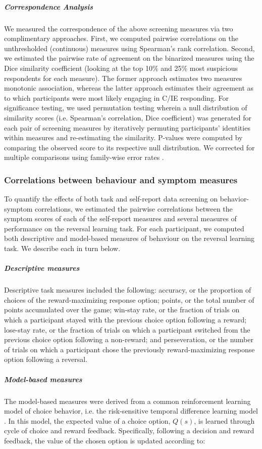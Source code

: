 \documentclass[a4paper,notitlepage,12pt]{article}
\begin{document}
\subparagraph{Correspondence Analysis} We measured the correspondence of the above screening measures via two complimentary approaches. First, we computed pairwise correlations on the unthresholded (continuous) measures using Spearman's rank correlation. Second, we estimated the pairwise rate of agreement on the binarized measures using the Dice similarity coefficient (looking at the top 10\% and 25\% most suspicious respondents for each measure). The former approach estimates two measures monotonic association, whereas the latter approach estimates their agreement as to which participants were most likely engaging in C/IE responding. For significance testing, we used permutation testing wherein a null distribution of similarity scores (i.e. Spearman's correlation, Dice coefficient) was generated for each pair of screening measures by iteratively permuting participants' identities within measures and re-estimating the similarity. P-values were computed by comparing the observed score to its respective null distribution. We corrected for multiple comparisons using family-wise error rates \cite{winkler2014permutation}.

\subsubsection{Correlations between behaviour and symptom measures}

To quantify the effects of both task and self-report data screening on behavior-symptom correlations, we estimated the pairwise correlations between the symptom scores of each of the self-report measures and several measures of performance on the reversal learning task. For each participant, we computed both descriptive and model-based measures of behaviour on the reversal learning task. We describe each in turn below.

\subparagraph{Descriptive measures} Descriptive task measures included the following: accuracy, or the proportion of choices of the reward-maximizing response option; points, or the total number of points accumulated over the game; win-stay rate, or the fraction of trials on which a participant stayed with the previous choice option following a reward; lose-stay rate, or the fraction of trials on which a participant switched from the previous choice option following a non-reward; and perseveration, or the number of trials on which a participant chose the previously reward-maximizing response option following a reversal. 

\subparagraph{Model-based measures} The model-based measures were derived from a common reinforcement learning model of choice behavior, i.e. the risk-sensitive temporal difference learning model \cite{niv2012neural}. In this model, the expected value of a choice option, $Q(s)$, is learned through cycle of choice and reward feedback. Specifically, following a decision and reward feedback, the value of the chosen option is updated according to:
\end{document}
